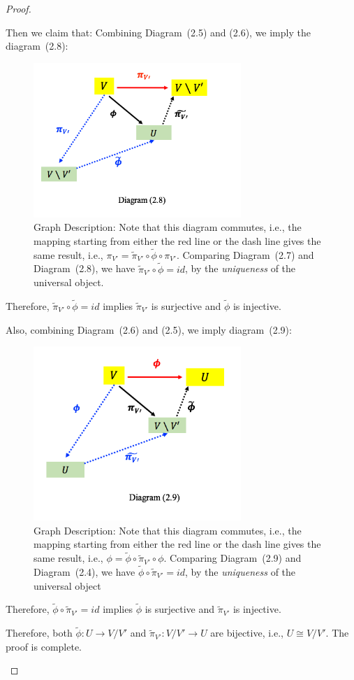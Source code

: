 \begin{proof}
\begin{enumerate}
Then we claim that: Combining Diagram~(2.5) and (2.6), we imply the diagram~(2.8):
\begin{figure}[H]
\centering
\includegraphics[width=0.7\textwidth]{week4/p_7}
\caption*{Graph Description: Note that this diagram commutes, i.e., the mapping starting from either the red line or the dash line gives the same result, i.e., $\pi_{V'} = \tilde{\pi}_{V'}\circ\tilde{\phi}\circ\pi_{V'}$.
Comparing Diagram~(2.7) and Diagram~(2.8), we have $\tilde{\pi}_{V'}\circ\tilde{\phi}=id$, by the 
\emph{uniqueness} of the universal object.
}
\end{figure}
Therefore, $\tilde{\pi}_{V'}\circ\tilde{\phi}=id$ implies $\tilde{\pi}_{V'}$ is surjective and $\tilde{\phi}$ is injective.

Also, combining Diagram~(2.6) and (2.5), we imply diagram~(2.9):
\begin{figure}[H]
\centering
\includegraphics[width=0.7\textwidth]{week4/p_8}
\caption*{Graph Description: Note that this diagram commutes, i.e., the mapping starting from either the red line or the dash line gives the same result, i.e., $\phi = \tilde{\phi}\circ\tilde{\pi}_{V'}\circ\phi$.
Comparing Diagram~(2.9) and Diagram~(2.4), we have $\tilde{\phi}\circ\tilde{\pi}_{V'}=id$,
by the \emph{uniqueness} of the universal object
}
\end{figure}
Therefore, $\tilde{\phi}\circ\tilde{\pi}_{V'}=id$ implies $\tilde{\phi}$ is surjective and $\tilde{\pi}_{V'}$ is injective.

Therefore, both $\tilde{\phi}:U\to V/ V'$ and $\tilde{\pi}_{V'}:V/ V'\to U$ are bijective, i.e., $U\cong V/ V'$. The proof is complete.
\end{enumerate}
\end{proof}

